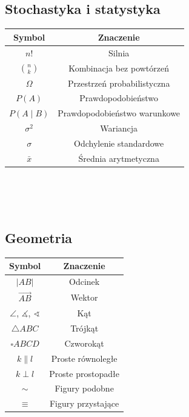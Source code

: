 \documentclass[14pt,a4paper]{extarticle}
\begin{document}
\begin{multicols}{2}

\subsection{Stochastyka i statystyka}

\begin{tabular}{*{2}{|c}|}
\hline
Symbol & Znaczenie \\
\hline
$n!$ & Silnia \\
$\binom{n}{k}$ & Kombinacja bez powtórzeń \\
$\Omega$ & Przestrzeń probabilistyczna \\
$P(A)$ & Prawdopodobieństwo \\
$P(A \mid\! B)$ & Prawdopodobieństwo warunkowe \\
$\sigma^{2}$ & Wariancja \\
$\sigma$ & Odchylenie standardowe \\
$\bar{x}$ & Średnia arytmetyczna \\
\hline
\end{tabular}
\\\\\\

\subsection*{\hspace{2cm}Geometria}

\hskip2.0cm
\begin{tabular}{*{2}{|c}|}
\hline
Symbol & Znaczenie \\
\hline
$\vert AB\vert$ & Odcinek \\
$\overset{\longrightarrow}{AB}$ & Wektor \\
$\angle{}$, $\measuredangle{}$, $\sphericalangle{}$ & Kąt \\
$\triangle ABC$ & Trójkąt \\
$\square ABCD$ & Czworokąt \\
$k \parallel l$ & Proste równoległe \\
$k \perp l$ & Proste prostopadłe \\
$\sim$ & Figury podobne \\
$\equiv$ & Figury przystające \\
\hline
\end{tabular}

\end{multicols}
\end{document}
